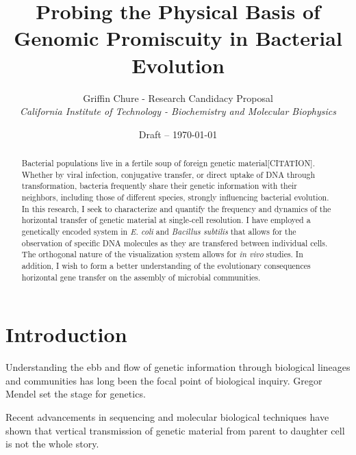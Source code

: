

\title{Probing the Physical Basis of Genomic Promiscuity in Bacterial Evolution}
\author{Griffin Chure - Research Candidacy Proposal\\
	\textit{\small California Institute of Technology - Biochemistry and Molecular
	Biophysics}}
\date{\small Draft -- \today}


\maketitle
\begin{abstract}
	Bacterial populations live in a fertile soup of foreign genetic
	material[CITATION]. Whether by viral infection, conjugative transfer, or
	direct uptake of DNA through transformation, bacteria frequently share
	their genetic information with their neighbors, including those of
	different species, strongly influencing bacterial evolution. In this
	research, I seek to characterize and quantify the frequency and dynamics
	of the horizontal transfer of genetic material at single-cell
	resolution. I have employed a genetically encoded system in \textit{E.
	coli} and \textit{Bacillus subtilis} that allows for the observation of
	specific DNA molecules as they are transfered between individual cells.
	The orthogonal nature of the visualization system allows for \textit{in
	vivo} studies. In addition, I wish to form a better understanding of the
	evolutionary consequences horizontal gene transfer on the assembly of
	microbial communities. 
\end{abstract}
\section*{Introduction}
Understanding the ebb and flow of genetic information through biological
lineages and communities has long been the focal point of biological inquiry.
Gregor Mendel set the stage for genetics. \cite{Syvanen:2012jn}

Recent advancements in sequencing and molecular biological techniques have shown
that vertical transmission of genetic material from parent to daughter cell is
not the whole story. 

